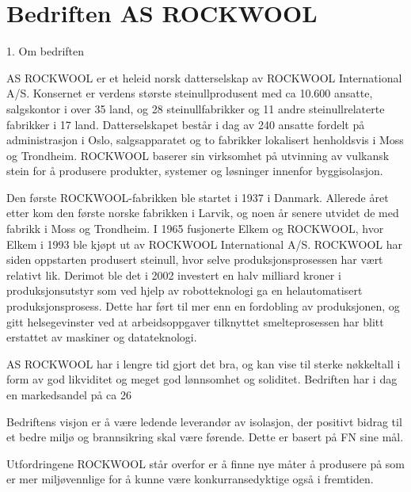 \section{Bedriften AS ROCKWOOL}
1. Om bedriften


AS ROCKWOOL er et heleid norsk datterselskap av ROCKWOOL International A/S. Konsernet er verdens største steinullprodusent med ca 10.600 ansatte, salgskontor i over 35 land, og 28 steinullfabrikker og 11 andre steinullrelaterte fabrikker i 17 land. Datterselskapet består i dag av 240 ansatte fordelt på administrasjon i Oslo, salgsapparatet og to fabrikker lokalisert henholdsvis i Moss og Trondheim. ROCKWOOL baserer sin virksomhet på utvinning av vulkansk stein for å produsere produkter, systemer og løsninger innenfor byggisolasjon.

Den første ROCKWOOL-fabrikken ble startet i 1937 i Danmark. Allerede året etter kom den første norske fabrikken i Larvik, og noen år senere utvidet de med fabrikk i Moss og Trondheim. I 1965 fusjonerte Elkem og ROCKWOOL, hvor Elkem i 1993 ble kjøpt ut av ROCKWOOL International A/S. ROCKWOOL har siden oppstarten produsert steinull, hvor selve produksjonsprosessen har vært relativt lik. Derimot ble det i 2002 investert en halv milliard kroner i produksjonsutstyr som ved hjelp av robotteknologi ga en helautomatisert produksjonsprosess. Dette har ført til mer enn en fordobling av produksjonen, og gitt helsegevinster ved at arbeidsoppgaver tilknyttet smelteprosessen har blitt erstattet av maskiner og datateknologi.

AS ROCKWOOL har i lengre tid gjort det bra, og kan vise til sterke nøkkeltall i form av god likviditet og meget god lønnsomhet og soliditet. Bedriften har i dag en markedsandel på ca 26%

Bedriftens visjon er å være ledende leverandør av isolasjon, der positivt bidrag til et bedre miljø og brannsikring skal være førende. Dette er basert på FN sine mål.

Utfordringene ROCKWOOL står overfor er å finne nye måter å produsere på som er mer miljøvennlige for å kunne være konkurransedyktige også i fremtiden. 


